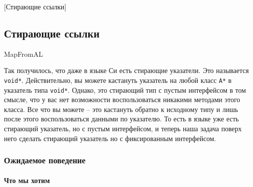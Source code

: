 [Стирающие ссылки]


\subsection{Стирающие ссылки}MapFromAL
\label{section::RefErasure}

Так получилось, что даже в языке Си есть стирающие указатели.
Это называется \texttt{void*}.
Действительно, вы можете кастануть указатель на любой класс \texttt{A*} в указатель типа \texttt{void*}.
Однако, это стирающий тип с пустым интерфейсом в том смысле, что у вас нет возможности воспользоваться никакими методами этого класса.
Все что вы можете -- это кастануть обратно к исходному типу и лишь после этого воспользоваться данными по указателю.
То есть в языке уже есть стирающий указатель, но с пустым интерфейсом, и теперь наша задача поверх него сделать стирающий указатель но с фиксированным интерфейсом.

\subsubsection{Ожидаемое поведение}

\paragraph{Что мы хотим}

